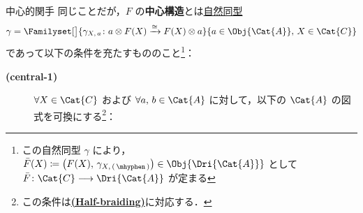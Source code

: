 \documentclass[TQFT_main]{subfiles}
\begin{document}
\begin{mydef}[label=def:central-functor,breakable]{中心的関手}
    同じことだが，$F$ の\textbf{中心構造}とは\hyperref[def:nat]{自然同型}
    \begin{align}
        \gamma = \Familyset[\big]{\gamma_{X,\, a} \colon a \otimes F(X) \xrightarrow{\cong} F(X) \otimes a}{a \in \Obj{\Cat{A}},\, X \in \Cat{C}}
    \end{align}
    であって以下の条件を充たすもののこと\footnote{この自然同型 $\gamma$ により，$\bar{F}(X) \coloneqq \bigl( F(X),\, \gamma_{X,\, (\, \mhyphen \,)} \bigr)  \in \Obj{\Dri{\Cat{A}}}$ として $\bar{F} \colon \Cat{C} \lto \Dri{\Cat{A}}$ が定まる}：
    \begin{description}
        \item[\textbf{(central-1)}]
        $\forall X \in \Cat{C}$ および $\forall a,\, b \in \Cat{A}$ に対して，以下の $\Cat{A}$ の図式を可換にする\footnote{この条件は\hyperref[def:Drinfeld-center]{\textsf{\textbf{(Half-braiding)}}}に対応する．}：
        \begin{center}
        \end{center}
        

\end{description}
\end{mydef}
\end{document}
